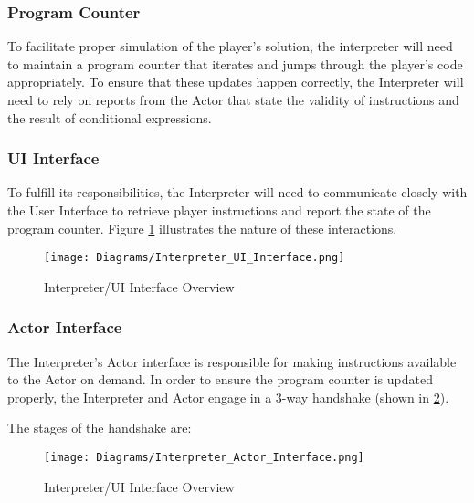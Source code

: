 \subsubsection{Program Counter}
To facilitate proper simulation of the player's solution, the interpreter will need to maintain a program counter that iterates and jumps through the player's code appropriately. To ensure that these updates happen correctly, the Interpreter will need to rely on reports from the Actor that state the validity of instructions and the result of conditional expressions.

\subsubsection{UI Interface}
To fulfill its responsibilities, the Interpreter will need to communicate closely with the User Interface to retrieve player instructions and report the state of the program counter. Figure \ref{fig:interpreter_UI_interface} illustrates the nature of these interactions.

\begin{figure}[!hb]
    \caption{Interpreter/UI Interface Overview}
    \label{fig:interpreter_UI_interface}
    \centering
    \texttt{[image: Diagrams/Interpreter\_UI\_Interface.png]}
\end{figure}

\subsubsection{Actor Interface}
The Interpreter's Actor interface is responsible for making instructions available to the Actor on demand. In order to ensure the program counter is updated properly, the Interpreter and Actor engage in a 3-way handshake (shown in \ref{fig:interpreter_Actor_interface}). 

The stages of the handshake are:

\begin{figure}[!hb]
    \caption{Interpreter/UI Interface Overview}
    \label{fig:interpreter_Actor_interface}
    \centering
    \texttt{[image: Diagrams/Interpreter\_Actor\_Interface.png]}
\end{figure}

